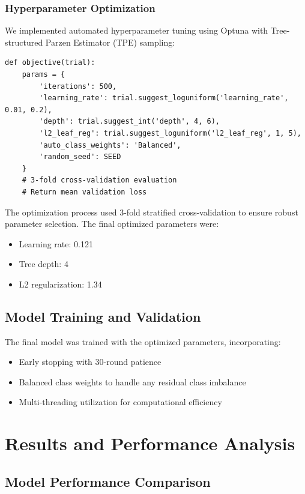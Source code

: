 \documentclass[11pt,a4paper]{article}
\begin{document}
\subsubsection{Hyperparameter Optimization}
We implemented automated hyperparameter tuning using Optuna with Tree-structured Parzen Estimator (TPE) sampling:

\begin{lstlisting}
def objective(trial):
    params = {
        'iterations': 500,
        'learning_rate': trial.suggest_loguniform('learning_rate', 0.01, 0.2),
        'depth': trial.suggest_int('depth', 4, 6),
        'l2_leaf_reg': trial.suggest_loguniform('l2_leaf_reg', 1, 5),
        'auto_class_weights': 'Balanced',
        'random_seed': SEED
    }
    # 3-fold cross-validation evaluation
    # Return mean validation loss
\end{lstlisting}

The optimization process used 3-fold stratified cross-validation to ensure robust parameter selection. The final optimized parameters were:
\begin{itemize}
    \item Learning rate: 0.121
    \item Tree depth: 4
    \item L2 regularization: 1.34
\end{itemize}

\subsection{Model Training and Validation}

The final model was trained with the optimized parameters, incorporating:
\begin{itemize}
    \item Early stopping with 30-round patience
    \item Balanced class weights to handle any residual class imbalance
    \item Multi-threading utilization for computational efficiency
\end{itemize}

\section{Results and Performance Analysis}
\label{sec:results}

\subsection{Model Performance Comparison}
\end{document}
